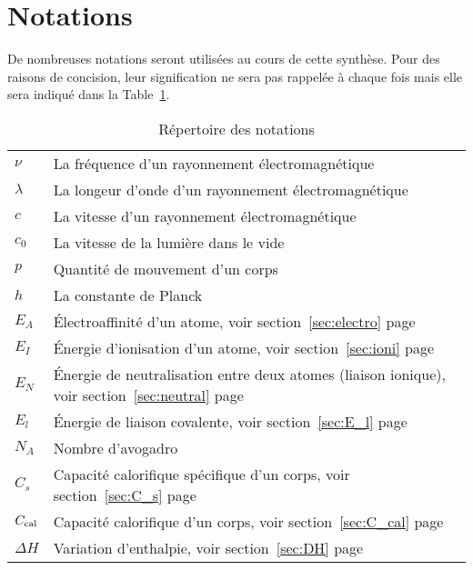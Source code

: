 \section{Notations}
\label{ann:nota}
De nombreuses notations seront utilisées au cours de cette synthèse.
Pour des raisons de concision,
leur signification ne sera pas rappelée à chaque fois mais elle sera indiqué dans la Table~\ref{tab:notations}.
\begin{table}[h!]
  \begin{center}
    \begin{tabular}{ll}
      $\nu$ & La fréquence d'un rayonnement électromagnétique\\
      $\lambda$ & La longeur d'onde d'un rayonnement électromagnétique\\
      $c$ & La vitesse d'un rayonnement électromagnétique\\
      $c_0$ & La vitesse de la lumière dans le vide\\
      $p$ & Quantité de mouvement d'un corps\\
      $h$ & La constante de Planck\\
      $E_A$ & \'Electroaffinité d'un atome,
      voir section~\ref{sec:electro} page~\pageref{sec:electro}\\
      $E_I$ & \'Energie d'ionisation d'un atome,
      voir section~\ref{sec:ioni} page~\pageref{sec:ioni}\\
      $E_N$ & \'Energie de neutralisation entre deux atomes (liaison ionique),
      voir section~\ref{sec:neutral} page~\pageref{sec:neutral}\\
      $E_l$ & \'Energie de liaison covalente,
      voir section~\ref{sec:E_l} page~\pageref{sec:E_l}\\ %
      $N_A$ & Nombre d'avogadro\\
      $C_s$ & Capacité calorifique spécifique d'un corps,
      voir section~\ref{sec:C_s} page~\pageref{sec:C_s}\\
      $C_\mathrm{cal}$ & Capacité calorifique d'un corps,
      voir section~\ref{sec:C_cal} page~\pageref{sec:C_cal}\\
      $\Delta H$ & Variation d'enthalpie,
      voir section~\ref{sec:DH} page~\pageref{sec:DH}
    \end{tabular}
    \caption{Répertoire des notations}
    \label{tab:notations}
  \end{center}
\end{table}

